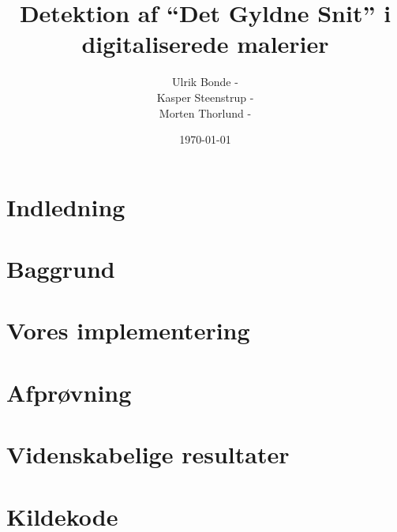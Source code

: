 \documentclass[a4paper, 10pt, danish, final]{article}
\title{Detektion af ``Det Gyldne Snit'' i digitaliserede malerier}
\author{Ulrik Bonde - \mailto{bonde@diku.dk}\\
Kasper Steenstrup - \mailto{khsj@diku.dk}\\
Morten Thorlund - \mailto{thorlund@diku.dk}}
\date{\today}
\begin{document}
\maketitle
\thispagestyle{empty}



\tableofcontents
\listoftables
\listoffigures

\section{Indledning}


\section{Baggrund}


\section{Vores implementering}


\section{Afprøvning}

\section{Videnskabelige resultater}

\newpage




\newpage
\appendix

\section{Kildekode}
%
\end{document}
